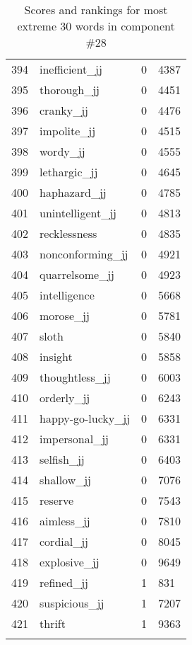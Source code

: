 \begin{longtable}[!htbp]{| rlr@{.}l |}
    394 & inefficient\_jj & 0 & 4387 \\
    395 & thorough\_jj & 0 & 4451 \\
    396 & cranky\_jj & 0 & 4476 \\
    397 & impolite\_jj & 0 & 4515 \\
    398 & wordy\_jj & 0 & 4555 \\
    399 & lethargic\_jj & 0 & 4645 \\
    400 & haphazard\_jj & 0 & 4785 \\
    401 & unintelligent\_jj & 0 & 4813 \\
    402 & recklessness & 0 & 4835 \\
    403 & nonconforming\_jj & 0 & 4921 \\
    404 & quarrelsome\_jj & 0 & 4923 \\
    405 & intelligence & 0 & 5668 \\
    406 & morose\_jj & 0 & 5781 \\
    407 & sloth & 0 & 5840 \\
    408 & insight & 0 & 5858 \\
    409 & thoughtless\_jj & 0 & 6003 \\
    410 & orderly\_jj & 0 & 6243 \\
    411 & happy-go-lucky\_jj & 0 & 6331 \\
    412 & impersonal\_jj & 0 & 6331 \\
    413 & selfish\_jj & 0 & 6403 \\
    414 & shallow\_jj & 0 & 7076 \\
    415 & reserve & 0 & 7543 \\
    416 & aimless\_jj & 0 & 7810 \\
    417 & cordial\_jj & 0 & 8045 \\
    418 & explosive\_jj & 0 & 9649 \\
    419 & refined\_jj & 1 & 831 \\
    420 & suspicious\_jj & 1 & 7207 \\
    421 & thrift & 1 & 9363 \\
    \hline
    \caption{Scores and rankings for most extreme 30 words in component \#28} \\
\end{longtable}
